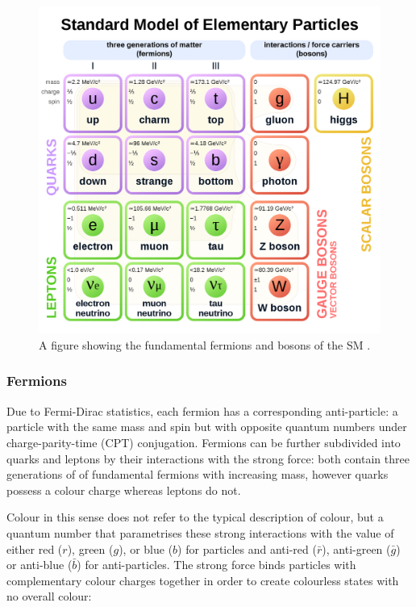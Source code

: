 \documentclass[12pt,a4paper,epsf,portrait,times,epsfig]{report}
\begin{document}
	\begin{figure}[h!]
		\centering
		\includegraphics[scale=0.25]{Standard_Model.png}
		\caption{A figure showing the fundamental fermions and bosons of the SM \cite{StandardModelImage}.}
		\label{Fig:StandardModel1} 
	\end{figure}

	\subsubsection{Fermions}

	Due to Fermi-Dirac statistics, each fermion has a corresponding anti-particle: a particle with the same mass and spin but with opposite quantum numbers under charge-parity-time (CPT) conjugation. Fermions can be further subdivided into quarks and leptons by their interactions with the strong force: both contain three generations of of fundamental fermions with increasing mass, however quarks possess a colour charge whereas leptons do not. \par
	
	Colour in this sense does not refer to the typical description of colour, but a quantum number that parametrises these strong interactions with the value of either red ($r$), green ($g$), or blue ($b$) for particles and anti-red ($\bar{r}$), anti-green ($\bar{g}$) or anti-blue ($\bar{b}$) for anti-particles. The strong force binds particles with complementary colour charges together in order to create colourless states with no overall colour: 
	
\end{document}
